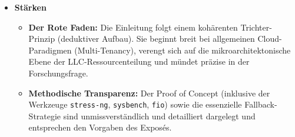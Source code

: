 \documentclass[
  11pt,
  a4paper,
  parskip=half         %
]{scrartcl}
\begin{document}
\begin{itemize}
  \item \textbf{Stärken}
  \begin{itemize}
    \item \textbf{Der Rote Faden:} Die Einleitung folgt einem kohärenten Trichter-Prinzip
          (deduktiver Aufbau). Sie beginnt breit bei allgemeinen Cloud-Paradigmen (Multi-Tenancy),
          verengt sich auf die mikroarchitektonische Ebene der LLC-Ressourcenteilung und mündet
          präzise in der Forschungsfrage.
    \item \textbf{Methodische Transparenz:} Der Proof of Concept (inklusive der Werkzeuge
          \texttt{stress-ng}, \texttt{sysbench}, \texttt{fio}) sowie die essenzielle
          Fallback-Strategie sind unmissverständlich und detailliert dargelegt und entsprechen
          den Vorgaben des Exposés.
  \end{itemize}


\end{itemize}
\end{document}
